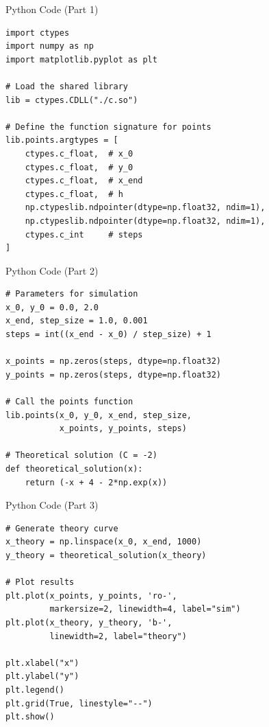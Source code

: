 \documentclass{beamer}
\begin{document}
\begin{frame}[fragile]{Python Code (Part 1)}
\lstset{language=Python}
\begin{lstlisting}
import ctypes
import numpy as np
import matplotlib.pyplot as plt

# Load the shared library
lib = ctypes.CDLL("./c.so")

# Define the function signature for points
lib.points.argtypes = [
    ctypes.c_float,  # x_0
    ctypes.c_float,  # y_0
    ctypes.c_float,  # x_end
    ctypes.c_float,  # h
    np.ctypeslib.ndpointer(dtype=np.float32, ndim=1),  
    np.ctypeslib.ndpointer(dtype=np.float32, ndim=1),  
    ctypes.c_int     # steps
]
\end{lstlisting}
\end{frame}

\begin{frame}[fragile]{Python Code (Part 2)}
\lstset{language=Python}
\begin{lstlisting}
# Parameters for simulation
x_0, y_0 = 0.0, 2.0
x_end, step_size = 1.0, 0.001
steps = int((x_end - x_0) / step_size) + 1

x_points = np.zeros(steps, dtype=np.float32)
y_points = np.zeros(steps, dtype=np.float32)

# Call the points function
lib.points(x_0, y_0, x_end, step_size, 
           x_points, y_points, steps)

# Theoretical solution (C = -2)
def theoretical_solution(x):
    return (-x + 4 - 2*np.exp(x))
\end{lstlisting}
\end{frame}

\begin{frame}[fragile]{Python Code (Part 3)}
\lstset{language=Python}
\begin{lstlisting}
# Generate theory curve
x_theory = np.linspace(x_0, x_end, 1000)
y_theory = theoretical_solution(x_theory)

# Plot results
plt.plot(x_points, y_points, 'ro-', 
         markersize=2, linewidth=4, label="sim")
plt.plot(x_theory, y_theory, 'b-', 
         linewidth=2, label="theory")

plt.xlabel("x")
plt.ylabel("y")
plt.legend()
plt.grid(True, linestyle="--")
plt.show()
\end{lstlisting}
\end{frame}
\end{document}
